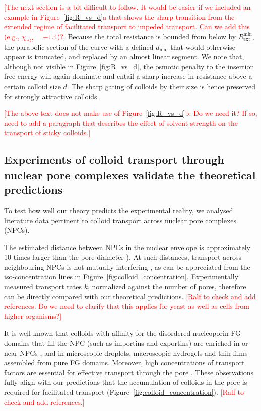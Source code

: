 \documentclass[12pt, a4paper]{article}
\newcommand\todo[1]{\textcolor{red}{#1}}
\begin{document}
\todo{[The next section is a bit difficult to follow. It would be easier if we included an example in Figure~\ref{fig:R_vs_d}a that shows the sharp transition from the extended regime of facilitated transport to impeded transport. Can we add this (e.g., $\chi_{\text{PC}} = -1.4$)?]}
Because the total resistance is bounded from below by $R_{\text{ext}}^{\text{min}}$, the parabolic section of the curve with a defined $d_{\text{min}}$ that would otherwise appear is truncated, and replaced by an almost linear segment.
We note that, although not visible in Figure~\ref{fig:R_vs_d}, the osmotic penalty to the insertion free energy will again dominate and entail a sharp increase in resistance above a certain colloid size $d$.
The sharp gating of colloids by their size is hence preserved for strongly attractive colloids.

\todo{[The above text does not make use of Figure~\ref{fig:R_vs_d}b. Do we need it? If so, need to add a paragraph that describes the effect of solvent strength on the transport of sticky colloids.]}


\subsection{Experiments of colloid transport through nuclear pore complexes validate the theoretical predictions}

To test how well our theory predicts the experimental reality, we analysed literature data pertinent to colloid transport across nuclear pore complexes (NPCs).

The estimated distance between NPCs in the nuclear envelope is approximately 10 times larger than the pore diameter \cite{Yang2004, Daigle2001, Feldherr1984, Kubitscheck2000}). At such distances, transport across neighbouring NPCs is not mutually interfering \cite{Fabrikant1985}, as can be appreciated from the iso-concentration lines in Figure~\ref{fig:colloid_concentration}. Experimentally measured transport rates $k$, normalized against the number of pores, therefore can be directly compared with our theoretical predictions.
\todo{[Ralf to check and add references. Do we need to clarify that this applies for yeast as well as cells from higher organisms?]} 

It is well-known that colloids with affinity for the disordered nucleoporin FG domains that fill the NPC (such as importins and exportins) are enriched in or near NPCs \cite{Beck2007, Gruenwald2010, Tu2011}, and in microscopic droplets, macroscopic hydrogels and thin films assembled from pure FG domains.
Moreover, high concentrations of transport factors are essential for effective transport through the pore \cite{Lowe2015}.
These observations fully align with our predictions that the accumulation of colloids in the pore is required for facilitated transport (Figure~\ref{fig:colloid_concentration}).
\todo{[Ralf to check and add references.]}
\end{document}
